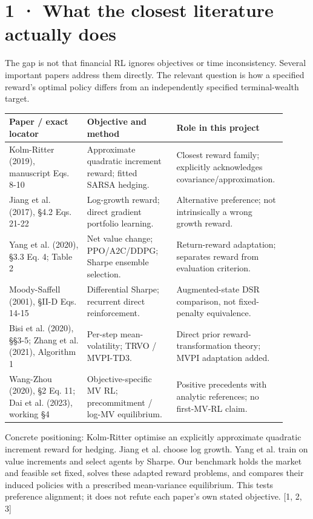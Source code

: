 \documentclass[10pt,a4paper]{article}
\begin{document}
\section*{1 · What the closest literature actually does}
The gap is not that financial RL ignores objectives or time inconsistency. Several important papers address them directly. The relevant question is how a specified reward’s optimal policy differs from an independently specified terminal-wealth target.

\begin{longtable}{p{0.273\linewidth}p{0.319\linewidth}p{0.319\linewidth}}
\hline
\textbf{Paper / exact locator} & \textbf{Objective and method} & \textbf{Role in this project}\\\hline
Kolm-Ritter (2019), manuscript Eqs. 8-10 & Approximate quadratic increment reward; fitted SARSA hedging. & Closest reward family; explicitly acknowledges covariance/approximation.\\\hline
Jiang et al. (2017), §4.2 Eqs. 21-22 & Log-growth reward; direct gradient portfolio learning. & Alternative preference; not intrinsically a wrong growth reward.\\\hline
Yang et al. (2020), §3.3 Eq. 4; Table 2 & Net value change; PPO/A2C/DDPG; Sharpe ensemble selection. & Return-reward adaptation; separates reward from evaluation criterion.\\\hline
Moody-Saffell (2001), §II-D Eqs. 14-15 & Differential Sharpe; recurrent direct reinforcement. & Augmented-state DSR comparison, not fixed-penalty equivalence.\\\hline
Bisi et al. (2020), §§3-5; Zhang et al. (2021), Algorithm 1 & Per-step mean-volatility; TRVO / MVPI-TD3. & Direct prior reward-transformation theory; MVPI adaptation added.\\\hline
Wang-Zhou (2020), §2 Eq. 11; Dai et al. (2023), working §4 & Objective-specific MV RL; precommitment / log-MV equilibrium. & Positive precedents with analytic references; no first-MV-RL claim.\\\hline
\end{longtable}
Concrete positioning: Kolm-Ritter optimise an explicitly approximate quadratic increment reward for hedging. Jiang et al. choose log growth. Yang et al. train on value increments and select agents by Sharpe. Our benchmark holds the market and feasible set fixed, solves these adapted reward problems, and compares their induced policies with a prescribed mean-variance equilibrium. This tests preference alignment; it does not refute each paper’s own stated objective. [1, 2, 3]
\end{document}
